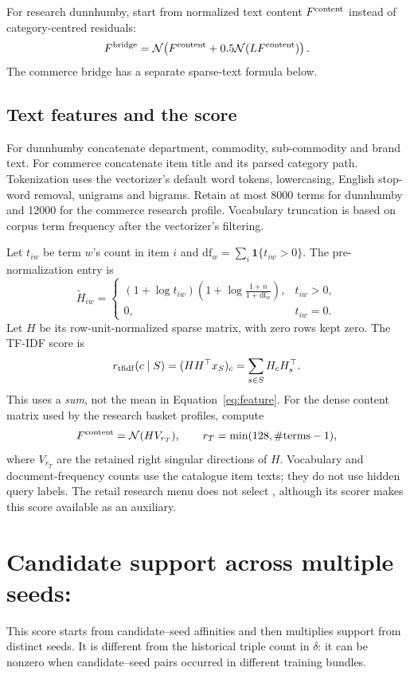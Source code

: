 \documentclass[11pt,a4paper]{article}
\newcommand{\rn}{\mathcal N}
\DeclareRobustCommand{\key}[1]{\texttt{\detokenize{#1}}}
\newcommand{\ind}{\mathbf 1}
\begin{document}
For research dunnhumby, start from normalized text content $F^{\rm content}$
instead of category-centred residuals:
\[
 F^{\rm bridge}=\rn\!\left(F^{\rm content}
 +0.5\rn(LF^{\rm content})\right).
\]
The commerce bridge has a separate sparse-text formula below.

\subsection{Text features and the \key{tfidf} score}\label{sec:text}
For dunnhumby concatenate department, commodity, sub-commodity and brand text.
For commerce concatenate item title and its parsed category path. Tokenization
uses the vectorizer's default word tokens, lowercasing, English stop-word
removal, unigrams and bigrams. Retain at most 8000 terms for dunnhumby and
12000 for the commerce research profile. Vocabulary truncation is based on
corpus term frequency after the vectorizer's filtering.

Let $t_{iw}$ be term $w$'s count in item $i$ and
$\mathrm{df}_w=\sum_i\ind\{t_{iw}>0\}$. The pre-normalization entry is
\[
 \widetilde H_{iw}=
 \begin{cases}
 (1+\log t_{iw})\left(1+\log\frac{1+n}{1+\mathrm{df}_w}\right),&t_{iw}>0,\\
 0,&t_{iw}=0.
 \end{cases}
\]
Let $H$ be its row-unit-normalized sparse matrix, with zero rows kept zero.
The TF-IDF score is
\begin{equation}
 r_{\rm tfidf}(c\mid S)=(HH^\top x_S)_c=\sum_{s\in S}H_cH_s^\top.
\end{equation}
This uses a \emph{sum}, not the mean in Equation~\eqref{eq:feature}.
For the dense content matrix used by the research basket profiles, compute
\[
 F^{\rm content}=\rn(HV_{r_T}),\qquad r_T=\min(128,\#\text{terms}-1),
\]
where $V_{r_T}$ are the retained right singular directions of $H$.
Vocabulary and document-frequency counts use the catalogue item texts;
they do not use hidden query labels. The retail research menu does not select
\key{tfidf}, although its scorer makes this score available as an auxiliary.

\section{Candidate support across multiple seeds: \key{rao}}

This score starts from candidate--seed affinities and then multiplies support
from distinct seeds. It is different from the historical triple count in
$\delta$: it can be nonzero when candidate--seed pairs occurred in different
training bundles.
\end{document}
